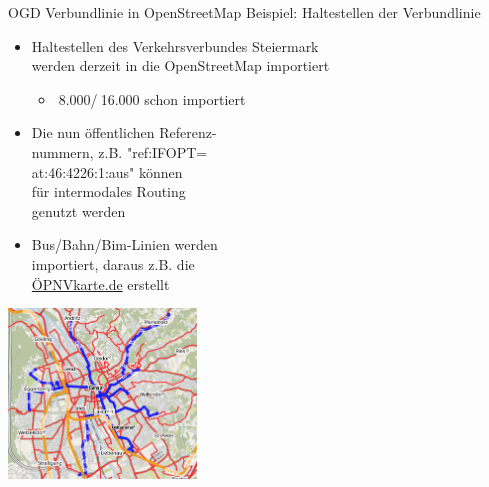 \documentclass{beamer}
\begin{document}
\begin{frame}{OGD Verbundlinie in OpenStreetMap}
    Beispiel: Haltestellen der Verbundlinie

    \begin{itemize}
        \item Haltestellen des Verkehrsverbundes Steiermark \\
            werden derzeit in die OpenStreetMap importiert
    \begin{itemize}
        \item $~$8.000/$~$16.000 schon importiert
    \end{itemize}
        \item Die nun öffentlichen Referenz- \\ nummern, z.B. "ref:IFOPT=\\at:46:4226:1:aus" können \\ für intermodales Routing \\ genutzt werden
  \vspace*{0.2cm}
        \item Bus/Bahn/Bim-Linien werden \\ importiert, daraus z.B. die \\ \href{http://ÖPNVkarte.de}{ÖPNVkarte.de} erstellt
  \vspace*{-4.3cm}
    \end{itemize}
 \hfill \includegraphics[width=5.0cm]{oepnv.png}

\end{frame}
\end{document}
